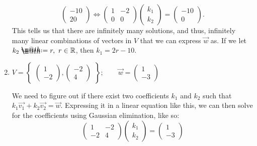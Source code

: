 \documentclass{article}
\makeatletter
\newcommand*{\defeq}{\mathrel{\rlap{%
                     \raisebox{0.3ex}{$\m@th\cdot$}}%
                     \raisebox{-0.3ex}{$\m@th\cdot$}}%
                     =}
\makeatother
\begin{document}
\begin{enumerate}
\begin{solution}
\[\begin{pmatrix}
                -10\\20
            \end{pmatrix} \Longleftrightarrow \begin{pmatrix}
                1&-2 \\ 0&0
            \end{pmatrix}\begin{pmatrix}
                k_1\\k_2
            \end{pmatrix} = \begin{pmatrix}
                -10\\0
            \end{pmatrix}.
        \] This tells us that there are infinitely many solutions, and thus, infinitely many linear combinations of vectors in \(V\) that we can express \(\overrightarrow{w}\) as. If we let \(k_2\defeq r,~r\in\mathbb{R}\), then \(k_1 = 2r -10\).
    \end{solution}
    \item \(V = \begin{Bmatrix}
        \begin{pmatrix}
            1\\-2
        \end{pmatrix},\begin{pmatrix}
            -2\\4
        \end{pmatrix}
    \end{Bmatrix}; \qquad \overrightarrow{w} = \begin{pmatrix}
        1\\-3
    \end{pmatrix}\)\begin{solution}
        We need to figure out if there exist two coefficients \(k_1\) and \(k_2\) such that \(k_1\overrightarrow{v_1} + k_2\overrightarrow{v_2} = \overrightarrow{w}\).
        Expressing it in a linear equation like this, we can then solve for the coefficients using Gaussian elimination, like so:\[
            \begin{pmatrix}
                1&-2 \\ -2&4
            \end{pmatrix}\begin{pmatrix}
                k_1\\k_2
            \end{pmatrix} = \begin{pmatrix}
                1\\-3

\end{pmatrix}\]
\end{solution}
\end{enumerate}
\end{document}
